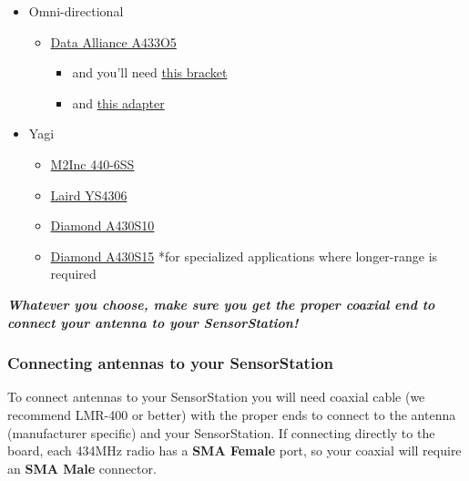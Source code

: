 \documentclass[
]{article}
\providecommand{\tightlist}{%
  \setlength{\itemsep}{0pt}\setlength{\parskip}{0pt}}
\begin{document}
\begin{itemize}
\tightlist
\item
  Omni-directional

  \begin{itemize}
  \tightlist
  \item
    \href{https://www.data-alliance.net/antenna-433mhz-5dbi-omnidirectional-fiberglass-w-n-male-vhf-uhf-marine/}{Data
    Alliance A433O5}

    \begin{itemize}
    \tightlist
    \item
      and you'll need
      \href{https://www.data-alliance.net/l-mount-for-antenna-pole-or-wall-mount-hole-for-n-female-or-rp-sma/}{this
      bracket}
    \item
      and
      \href{https://www.data-alliance.net/n-type-female-to-female-coupler-adapter-w-o-ring-weatherproof-bulkhead/}{this
      adapter}
    \end{itemize}
  \end{itemize}
\item
  Yagi

  \begin{itemize}
  \tightlist
  \item
    \href{https://www.m2inc.com/FG4406SS}{M2Inc 440-6SS}
  \item
    \href{https://www.mouser.com/ProductDetail/Laird-Connectivity/YS4306?qs=EU6FO9ffTwelQ7\%2FXOHiHew\%3D\%3D}{Laird
    YS4306}
  \item
    \href{https://www.hamradio.com/detail.cfm?pid=H0-005816}{Diamond
    A430S10}
  \item
    \href{https://www.dxengineering.com/parts/dmn-a430s15}{Diamond
    A430S15} *for specialized applications where longer-range is
    required
  \end{itemize}
\end{itemize}

\emph{\textbf{Whatever you choose, make sure you get the proper coaxial
end to connect your antenna to your SensorStation!}}

\hypertarget{connecting-antennas-to-your-sensorstation}{%
\subsubsection{Connecting antennas to your
SensorStation}\label{connecting-antennas-to-your-sensorstation}}

To connect antennas to your SensorStation you will need coaxial cable
(we recommend LMR-400 or better) with the proper ends to connect to the
antenna (manufacturer specific) and your SensorStation. If connecting
directly to the board, each 434MHz radio has a \textbf{SMA Female} port,
so your coaxial will require an \textbf{SMA Male} connector.
\end{document}
